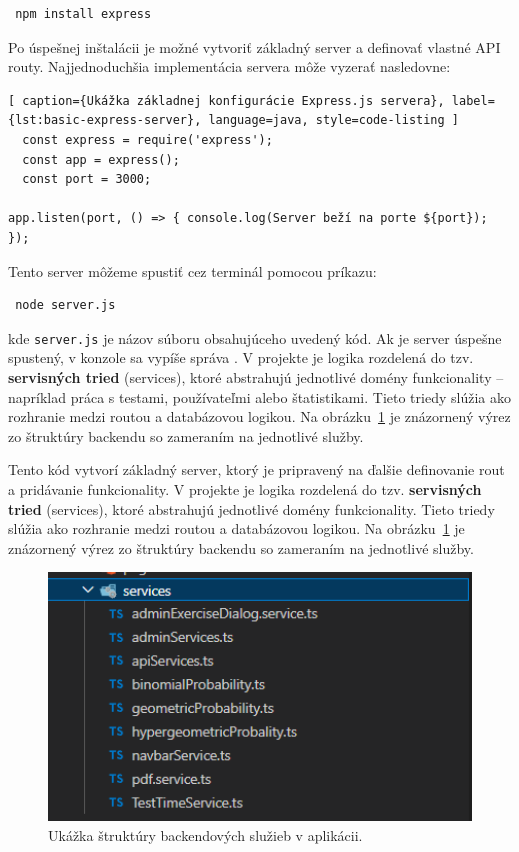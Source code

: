 \begin{verbatim} npm install express \end{verbatim}

Po úspešnej inštalácii je možné vytvoriť základný server a definovať vlastné API routy. Najjednoduchšia implementácia servera môže vyzerať nasledovne:

\begin{lstlisting}[ caption={Ukážka základnej konfigurácie Express.js servera}, label={lst:basic-express-server}, language=java, style=code-listing ] 
  const express = require('express'); 
  const app = express(); 
  const port = 3000;

app.listen(port, () => { console.log(Server beží na porte ${port}); }); 
\end{lstlisting}

Tento server môžeme spustiť cez terminál pomocou príkazu:

\begin{verbatim} node server.js \end{verbatim}

kde \texttt{server.js} je názov súboru obsahujúceho uvedený kód. Ak je server úspešne spustený, v konzole sa vypíše správa .
 V projekte je logika rozdelená do tzv. \textbf{servisných tried} (services), ktoré abstrahujú jednotlivé domény funkcionality – napríklad práca s testami, používateľmi alebo štatistikami. 
 Tieto triedy slúžia ako rozhranie medzi routou a databázovou logikou. 
Na obrázku~\ref{fig:backend-services} je znázornený výrez zo štruktúry backendu so zameraním na jednotlivé služby.

Tento kód vytvorí základný server, ktorý je pripravený na ďalšie definovanie rout a pridávanie funkcionality.
 V projekte je logika rozdelená do tzv. \textbf{servisných tried} (services), ktoré abstrahujú jednotlivé domény funkcionality.
  Tieto triedy slúžia ako rozhranie medzi routou a databázovou logikou.
 Na obrázku~\ref{fig:backend-services} je znázornený výrez zo štruktúry backendu so zameraním na jednotlivé služby.
\begin{figure}[H]
  \centering
  \includegraphics[width=13cm]{img/backend-services.png}
  \caption{Ukážka štruktúry backendových služieb v aplikácii.}
  \label{fig:backend-services}
\end{figure}

